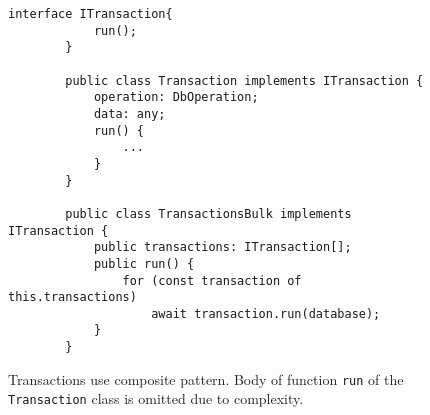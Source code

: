 \begin{figure}[h]
    \centering
    \begin{lstlisting}[style=ES6]
        interface ITransaction{
            run();
        }
        
        public class Transaction implements ITransaction {
            operation: DbOperation;
            data: any;
            run() {
                ...
            }
        }
        
        public class TransactionsBulk implements ITransaction {
            public transactions: ITransaction[];
            public run() {
                for (const transaction of this.transactions)
                    await transaction.run(database);
            }
        }
    \end{lstlisting}
    \caption{Transactions use composite pattern. Body of function \texttt{run} of the \texttt{Transaction} class is omitted due to complexity.}
    \label{transactionsComposite}
\end{figure}


